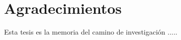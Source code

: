 \chapter*{Agradecimientos}
\pagestyle{empty}

Esta tesis es la memoria del camino de investigación .....

